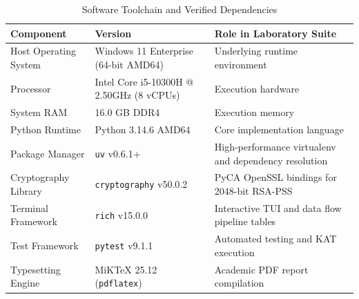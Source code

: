 \documentclass[12pt,a4paper]{report}
\begin{document}
\begin{table}[h!]
\centering
\fontsize{9}{11.5}\selectfont
\renewcommand{\arraystretch}{0.92}
\begin{tabularx}{\linewidth}{|l|l|X|}
\hline
\rowcolor{tableheader}
\textbf{Component} & \textbf{Version} & \textbf{Role in Laboratory Suite} \\
\hline
Host Operating System & Windows 11 Enterprise (64-bit AMD64) & Underlying runtime environment \\
\hline
Processor & Intel Core i5-10300H @ 2.50GHz (8 vCPUs) & Execution hardware \\
\hline
System RAM & 16.0 GB DDR4 & Execution memory \\
\hline
Python Runtime & Python 3.14.6 AMD64 & Core implementation language \\
\hline
Package Manager & \texttt{uv} v0.6.1+ & High-performance virtualenv and dependency resolution \\
\hline
Cryptography Library & \texttt{cryptography} v50.0.2 & PyCA OpenSSL bindings for 2048-bit RSA-PSS \\
\hline
Terminal Framework & \texttt{rich} v15.0.0 & Interactive TUI and data flow pipeline tables \\
\hline
Test Framework & \texttt{pytest} v9.1.1 & Automated testing and KAT execution \\
\hline
Typesetting Engine & MiKTeX 25.12 (\texttt{pdflatex}) & Academic PDF report compilation \\
\hline
\end{tabularx}
\caption{Software Toolchain and Verified Dependencies}
\label{tab:sysreq}
\end{table}
\end{document}
